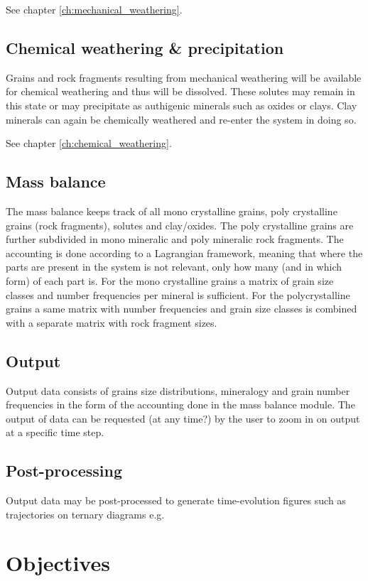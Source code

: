     See chapter \ref{ch:mechanical_weathering}. %

    \subsection{Chemical weathering \& precipitation}
    Grains and rock fragments resulting from mechanical weathering will be available for chemical weathering and thus will be dissolved. %
    These solutes may remain in this state or may precipitate as authigenic minerals such as oxides or clays. %
    Clay minerals can again be chemically weathered and re-enter the system in doing so. %

    See chapter \ref{ch:chemical_weathering}. %

    \subsection{Mass balance}
    The mass balance keeps track of all mono crystalline grains, poly crystalline grains (rock fragments), solutes and clay/oxides. %
    The poly crystalline grains are further subdivided in mono mineralic and poly mineralic rock fragments. %
    The accounting is done according to a Lagrangian framework, meaning that where the parts are present in the system is not relevant, only how many (and in which form) of each part is. %
    For the mono crystalline grains a matrix of grain size classes and number frequencies per mineral is sufficient. %
    For the polycrystalline grains a same matrix with number frequencies and grain size classes is combined with a separate matrix with rock fragment sizes. %

    \subsection{Output}
    Output data consists of grains size distributions, mineralogy and grain number frequencies in the form of the accounting done in the mass balance module. %
    The output of data can be requested (at any time?) by the user to zoom in on output at a specific time step. %

    \subsection{Post-processing}
    Output data may be post-processed to generate time-evolution figures such as trajectories on ternary diagrams e.g. %

\section{Objectives}

